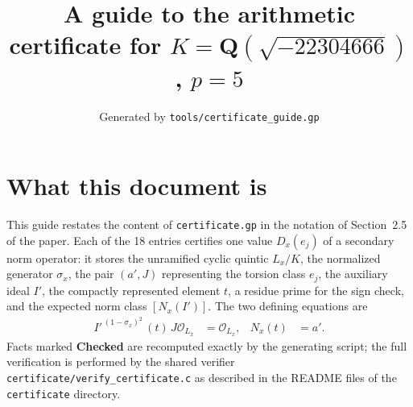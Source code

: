 \documentclass[11pt]{article}
\title{A guide to the arithmetic certificate for $K=\mathbf Q(\sqrt{-22304666})$, $p=5$}
\author{}
\date{Generated by \texttt{tools/certificate\_guide.gp}}
\begin{document}
\maketitle
\section*{What this document is}
This guide restates the content of \texttt{certificate.gp} in the
notation of Section~2.5 of the paper.  Each of the 18 entries
certifies one value $D_x(e_j)$ of a secondary norm operator: it
stores the unramified cyclic quintic $L_x/K$, the normalized
generator $\sigma_x$, the pair $(a',J)$ representing the torsion
class $e_j$, the auxiliary ideal $I'$, the compactly represented
element $t$, a residue prime for the sign check, and the expected
norm class $[N_x(I')]$.  The two defining equations are
\begin{align*}
I'^{\,(1-\sigma_x)^2}\,(t)\,J\mathcal O_{L_x}&=\mathcal O_{L_x},&
N_x(t)&=a'.
\end{align*}
Facts marked \textbf{Checked} are recomputed exactly by the
generating script; the full verification is performed by the
shared verifier \texttt{certificate/verify\_certificate.c} as
described in the README files of the \texttt{certificate}
directory.
\end{document}
